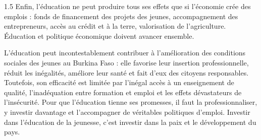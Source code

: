 \documentclass[12pt]{article}
\begin{document}
\begin{spacing}{1.5}
Enfin, l'éducation ne peut produire tous ses effets que si l'économie crée des emplois : fonds de financement des projets des jeunes, accompagnement des entrepreneurs, accès au crédit et à la terre, valorisation de l'agriculture. Éducation et politique économique doivent avancer ensemble.


L'éducation peut incontestablement contribuer à l'amélioration des conditions sociales des jeunes au Burkina Faso : elle favorise leur insertion professionnelle, réduit les inégalités, améliore leur santé et fait d'eux des citoyens responsables. Toutefois, son efficacité est limitée par l'inégal accès à un enseignement de qualité, l'inadéquation entre formation et emploi et les effets dévastateurs de l'insécurité. Pour que l'éducation tienne ses promesses, il faut la professionnaliser, y investir davantage et l'accompagner de véritables politiques d'emploi. Investir dans l'éducation de la jeunesse, c'est investir dans la paix et le développement du pays.

\end{spacing}
\end{document}
